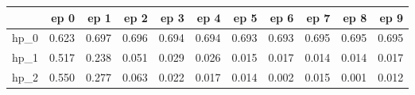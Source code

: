 \begin{tabular}{lrrrrrrrrrr}
\toprule
{} &   ep 0 &   ep 1 &   ep 2 &   ep 3 &   ep 4 &   ep 5 &   ep 6 &   ep 7 &   ep 8 &   ep 9 \\
\midrule
hp\_0 &  0.623 &  0.697 &  0.696 &  0.694 &  0.694 &  0.693 &  0.693 &  0.695 &  0.695 &  0.695 \\
hp\_1 &  0.517 &  0.238 &  0.051 &  0.029 &  0.026 &  0.015 &  0.017 &  0.014 &  0.014 &  0.017 \\
hp\_2 &  0.550 &  0.277 &  0.063 &  0.022 &  0.017 &  0.014 &  0.002 &  0.015 &  0.001 &  0.012 \\
\bottomrule
\end{tabular}
